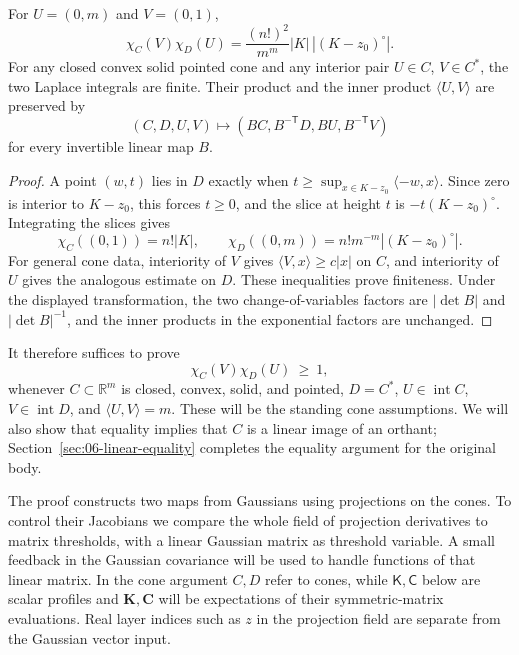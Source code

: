 \begin{lemma}\label{lem:cone-reduction}
For \(U=(0,m)\) and \(V=(0,1)\),
\[
\chi_C(V)\chi_D(U)=\frac{(n!)^2}{m^m}|K|\,|(K-z_0)^\circ|.
\]
For any closed convex solid pointed cone and any interior pair \(U\in C\), \(V\in C^*\), the two Laplace integrals are finite. Their product and the inner product \(\langle U,V\rangle\) are preserved by
\[
(C,D,U,V)\longmapsto(BC,B^{-\mathsf T}D,BU,B^{-\mathsf T}V)
\]
for every invertible linear map \(B\).
\end{lemma}
\begin{proof}
A point \((w,t)\) lies in \(D\) exactly when
\(t\ge\sup_{x\in K-z_0}\langle-w,x\rangle\). Since zero is interior to \(K-z_0\), this forces \(t\ge0\), and the slice at height \(t\) is \(-t(K-z_0)^\circ\). Integrating the slices gives
\[
\chi_C((0,1))=n!|K|,\qquad
\chi_D((0,m))=n!m^{-m}|(K-z_0)^\circ|.
\]
For general cone data, interiority of \(V\) gives \(\langle V,x\rangle\ge c|x|\) on \(C\), and interiority of \(U\) gives the analogous estimate on \(D\). These inequalities prove finiteness. Under the displayed transformation, the two change-of-variables factors are \(|\det B|\) and \(|\det B|^{-1}\), and the inner products in the exponential factors are unchanged.
\end{proof}

It therefore suffices to prove
\[
             \chi_C(V)\chi_D(U)\ \ge\ 1,                            \tag{1}\label{eq:1}
\]
whenever \(C\subset\mathbb R^m\) is closed, convex, solid, and pointed, \(D=C^*\), \(U\in\operatorname{int}C\), \(V\in\operatorname{int}D\), and \(\langle U,V\rangle=m\). These will be the standing cone assumptions. We will also show that equality implies that \(C\) is a linear image of an orthant; Section~\ref{sec:06-linear-equality} completes the equality argument for the original body.

The proof constructs two maps from Gaussians using projections on the cones. To control their Jacobians we compare the whole field of projection derivatives to matrix thresholds, with a linear Gaussian matrix as threshold variable. A small feedback in the Gaussian covariance will be used to handle functions of that linear matrix. In the cone argument \(C,D\) refer to cones, while \(\mathsf K,\mathsf C\) below are scalar profiles and \(\mathbf K,\mathbf C\) will be expectations of their symmetric-matrix evaluations. Real layer indices such as \(z\) in the projection field are separate from the Gaussian vector input.

